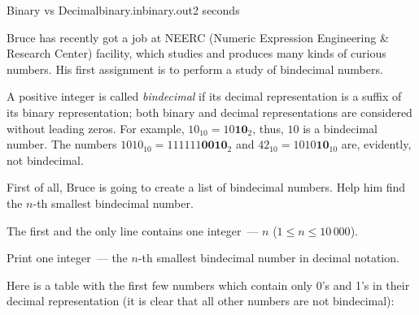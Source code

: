 \begin{problem}{Binary vs Decimal}{binary.in}{binary.out}{2 seconds}


Bruce has recently got a job at NEERC (Numeric Expression Engineering \& Research Center) facility, which studies and produces
many kinds of curious numbers. His first assignment is to perform a study of bindecimal numbers.

A positive integer is called \emph{bindecimal} if its decimal representation is a suffix of its binary representation; both binary and decimal representations are
considered without leading zeros.
For example, $10_{10} = 10\mathbf{10}_2$, thus, $10$ is a bindecimal number. The numbers $1010_{10} = 111111\mathbf{0010}_2$ and $42_{10} = 1010\mathbf{10}_{10}$
are, evidently, not bindecimal.

First of all, Bruce is going to create a list of bindecimal numbers. Help him find the $n$-th smallest bindecimal number.

\InputFile

The first and the only line contains one integer~--- $n$ ($1 \leq n \leq 10\,000$).

\OutputFile

Print one integer~--- the $n$-th smallest bindecimal number in decimal notation.

\Example

\begin{example}
%
%
%
\end{example}

\Note

Here is a table with the first few numbers which contain only 0's and 1's in their decimal representation (it is clear that all other numbers are not bindecimal):

\begin{center}


\end{center}
\end{problem}
